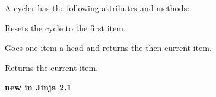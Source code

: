 \documentclass[a4paper,10pt,english]{sphinxmanual}
\begin{document}
\begin{fulllineitems}
A cycler has the following attributes and methods:

\begin{fulllineitems}
\label{templates:cycler.reset}
Resets the cycle to the first item.

\end{fulllineitems}


\begin{fulllineitems}
\label{templates:cycler.next}
Goes one item a head and returns the then current item.

\end{fulllineitems}


\begin{fulllineitems}
\label{templates:cycler.current}
Returns the current item.

\end{fulllineitems}


\textbf{new in Jinja 2.1}

\end{fulllineitems}

\end{document}
